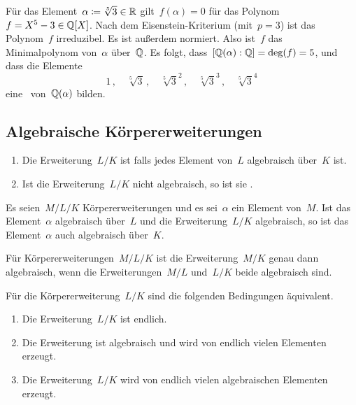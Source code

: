 \begin{example}
  Für das Element~$\alpha \coloneqq \sqrt[5]{3} \in \mathbb{R}$ gilt~$f(\alpha) = 0$ für das Polynom~$f = X^5 - 3 \in \mathbb{Q}[X]$.
  Nach dem Eisenstein-Kriterium (mit~$p = 3$) ist das Polynom~$f$ irreduzibel.
  Es ist außerdem normiert.
  Also ist~$f$ das Minimalpolynom von~$\alpha$ über~$\Rational$.
  Es folgt, dass~$[\mathbb{Q}(\alpha) : \mathbb{Q}] = \deg(f) = 5$, und dass die Elemente
  \[
    1 \,,
    \quad
    \sqrt[5]{3} \,,
    \quad
    \sqrt[5]{3}^2 \,,
    \quad
    \sqrt[5]{3}^3 \,,
    \quad
    \sqrt[5]{3}^4
  \]
  eine~\Basis{$\Rational$} von~$\mathbb{Q}(\alpha)$ bilden.
\end{example}




\clearpage





\subsection{Algebraische Körpererweiterungen}

\begin{definition}
  \leavevmode
  \begin{enumerate}
    \item
      Die Erweiterung~$L/K$ ist  falls jedes Element von~$L$ algebraisch über~$K$ ist.
    \item
      Ist die Erweiterung~$L/K$ nicht algebraisch, so ist sie .
  \end{enumerate}
\end{definition}

\begin{lemma}
  Es seien~$M/L/K$ Körpererweiterungen und es sei~$\alpha$ ein Element von~$M$.
  Ist das Element~$\alpha$ algebraisch über~$L$ und die Erweiterung~$L/K$ algebraisch, so ist das Element~$\alpha$ auch algebraisch über~$K$.
\end{lemma}

\begin{proposition}
  Für Körpererweiterungen~$M/L/K$ ist die Erweiterung~$M/K$ genau dann algebraisch, wenn die Erweiterungen~$M/L$ und~$L/K$ beide algebraisch sind.
\end{proposition}

\begin{proposition}
  Für die Körpererweiterung~$L/K$ sind die folgenden Bedingungen äquivalent.
  \begin{enumerate}
    \item
      Die Erweiterung~$L/K$ ist endlich.
    \item
      Die Erweiterung ist algebraisch und wird von endlich vielen Elementen erzeugt.
    \item
      Die Erweiterung~$L/K$ wird von endlich vielen algebraischen Elementen erzeugt.
  \end{enumerate}
\end{proposition}

